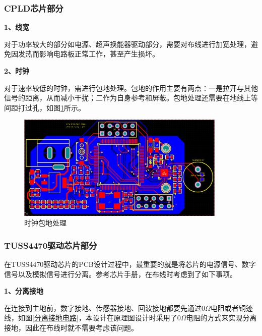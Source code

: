     \subsubsection{CPLD芯片部分}
    \noindent
    \textbf{1、线宽}\par
    对于功率较大的部分如电源、超声换能器驱动部分，需要对布线进行加宽处理，避免因发热而影响电路板正常工作，甚至产生损坏。\par
    \noindent
    \textbf{2、时钟}\par
    对于速率较低的时钟，需进行包地处理。包地的作用主要有两点：一是拉开与其他信号的距离，从而减小干扰；二作为自身参考和屏蔽。包地处理还需要在地线上等间距打过孔，如图\ref{时钟包地处理}所示。
     \begin{figure}[ht]
        \centering
        \includegraphics[width=10cm]{figure/overall pcb}
        \caption{时钟包地处理}
        \label{时钟包地处理}
    \end{figure}
    
    
    \subsubsection{TUSS4470驱动芯片部分}
    在TUSS4470驱动芯片的PCB设计过程中，最重要的就是将芯片的电源信号、数字信号以及模拟信号进行分离。参考芯片手册，在布线时考虑到了如下事项。\par
    \noindent
    \textbf{1、分离接地}\par
    在连接到主地前，数字接地、传感器接地、回波接地都要先通过0$\Omega$电阻或者铜迹线，如图\ref{分离接地电路}，本设计在原理图设计时采用了0$\Omega$电阻的方式来实现分离接地，因此在布线时就不需要考虑该问题。
         
